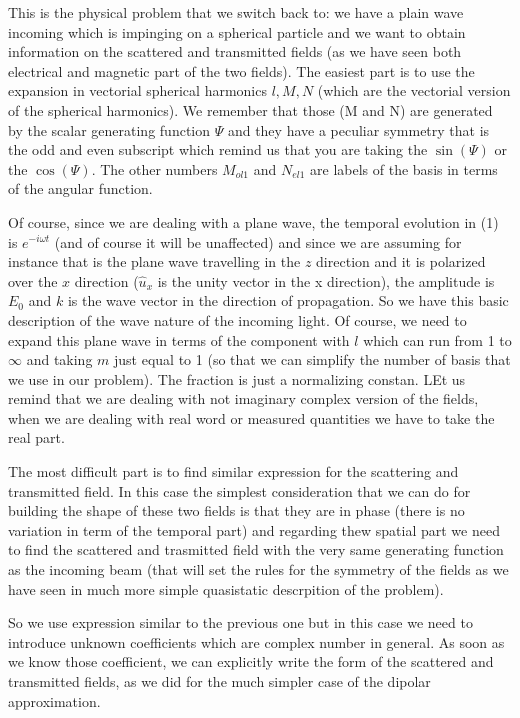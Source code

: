 \documentclass[../main/main.tex]{subfiles}
\begin{document}
This is the physical problem that we switch back to: we have a plain wave incoming which is impinging on a spherical particle and we want to obtain information on the scattered and transmitted fields (as we have seen both electrical and magnetic part of the two fields). The easiest part is to use the expansion in vectorial spherical harmonics \( l,M,N \) (which are the vectorial version of the spherical harmonics).
We remember that those (M and N) are generated by the scalar generating function \( \Psi  \) and they have a peculiar symmetry that is the odd and even subscript which remind us that you are taking the \( \sin(\Psi )  \) or the \( \cos(\Psi )  \).  The other numbers \( M_{ol1} \) and \( N_{el1} \) are labels of the basis in terms of the angular function.

Of course, since we are dealing with a plane wave, the temporal evolution in (1) is \( e^{-i \omega t}  \) (and of course it will be unaffected) and since we are assuming for instance that is the plane wave travelling in the \( z \) direction and it is polarized over the \( x \) direction (\( \hat{u}_x  \) is the unity vector in the x direction), the amplitude is \( E_0 \) and \( k  \) is the wave vector in the direction of propagation.
So we have this basic description of the wave nature of the incoming light.
Of course, we need to expand this plane wave in terms of the component with $l$ which can run from 1 to \( \infty  \) and taking $m$ just equal to 1 (so that we can simplify the number of basis that we use in our problem). The fraction is just a normalizing constan. LEt us remind that we are dealing with not imaginary complex version of the fields, when we are dealing with real word or measured quantities we have to take the real part.

The most difficult part is to find similar expression for the scattering and transmitted field.
In this case the simplest consideration that we can do for building the shape of these two fields is that they are in phase (there is no variation in term of the temporal part) and regarding thew spatial part we need to find the scattered and trasmitted field with the very same generating function as the incoming beam (that will set the rules for the symmetry of the fields as we have seen in much more simple quasistatic descrpition of the problem).

So we use expression similar to the previous one but in this case we need to introduce unknown coefficients which are complex number in general.
As soon as we know those coefficient, we can explicitly write the form of the scattered and transmitted fields, as we did for the much simpler case of the dipolar approximation.
\end{document}
